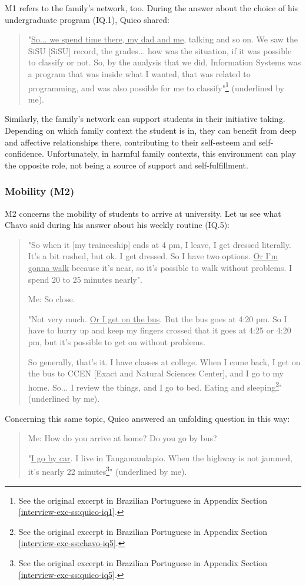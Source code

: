 \gls{M}1 refers to the family's network, too. During the answer about the choice of his undergraduate program (\gls{IQ}.1), Quico shared:
\begin{quote}
    "\underline{So... we spend time there, my dad and me}, talking and so on. We saw the \acrshort{SiSU} [\acrlong{SiSU}] record, the grades... how was the situation, if it was possible to classify or not. So, by the analysis that we did, Information Systems was a program that was inside what I wanted, that was related to programming, and was also possible for me to classify"\footnote{See the original excerpt in Brazilian Portuguese in Appendix Section \ref{interview-exc-ss:quico-iq1}.} (underlined by me).
\end{quote}
Similarly, the family's network can support students in their initiative taking. Depending on which family context the student is in, they can benefit from deep and affective relationships there, contributing to their self-esteem and self-confidence. Unfortunately, in harmful family contexts, this environment can play the opposite role, not being a source of support and self-fulfillment.

\subsubsection{Mobility (M2)}

\gls{M}2 concerns the mobility of students to arrive at university. Let us see what Chavo said during his answer about his weekly routine (\gls{IQ}.5):
\begin{quote}
    "So when it [my traineeship] ends at 4 pm, I leave, I get dressed literally. It's a bit rushed, but ok. I get dressed. So I have two options. \underline{Or I'm gonna walk} because it's near, so it's possible to walk without problems. I spend 20 to 25 minutes nearly". 

    \colorbox{black!15}{Me: So close.}
    
    "Not very much. \underline{Or I get on the bus}. But the bus goes at 4:20 pm. So I have to hurry up and keep my fingers crossed that it goes at 4:25 or 4:20 pm, but it's possible to get on without problems.
    
    So generally, that’s it. I have classes at college. When I come back, I get on the bus to CCEN [Exact and Natural Sciences Center], and I go to my home. So... I review the things, and I go to bed. Eating and sleeping\footnote{See the original excerpt in Brazilian Portuguese in Appendix Section \ref{interview-exc-ss:chavo-iq5}.}" (underlined by me).
\end{quote}
Concerning this same topic, Quico answered an unfolding question in this way:
\begin{quote}
    \colorbox{black!15}{Me: How do you arrive at home? Do you go by bus?}

    "\underline{I go by car}. I live in Tangamandapio. When the highway is not jammed, it's nearly 22 minutes\footnote{See the original excerpt in Brazilian Portuguese in Appendix Section \ref{interview-exc-ss:quico-iq5}.}" (underlined by me).
\end{quote}

